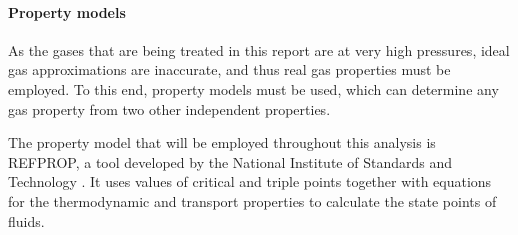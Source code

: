 \paragraph{Property models}
\label{sec:property_models}
As the gases that are being treated in this report are at very high pressures, ideal gas approximations are inaccurate, and thus real gas properties must be employed. To this end, property models must be used, which can determine any gas property from two other independent properties.

The property model that will be employed throughout this analysis is REFPROP, a tool developed by the National Institute of Standards and Technology \cite{refprop}. It uses values of critical and triple points together with equations for the thermodynamic and transport properties to calculate the state points of fluids.



